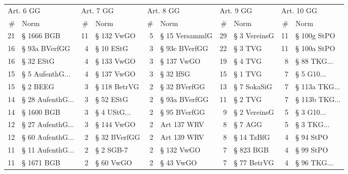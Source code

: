 \vspace{3mm}
\begin{tabular}{rlrlrlrlrl}
\toprule
\multicolumn{2}{l}{Art. 6 GG} & \multicolumn{2}{l}{Art. 7 GG} & \multicolumn{2}{l}{Art. 8 GG} & \multicolumn{2}{l}{Art. 9 GG} & \multicolumn{2}{l}{Art. 10 GG} \\
        \# &               Norm &         \# &              Norm &         \# &               Norm &         \# &         Norm &          \# &            Norm \\
\midrule
       21 &         § 1666 BGB &        11 &        § 132 VwGO &         5 &     § 15 VersammlG &        29 & § 3 VereinsG &         11 &     § 100g StPO \\
       16 &      § 93a BVerfGG &         4 &         § 10 EStG &         3 &      § 93c BVerfGG &        22 &      § 3 TVG &         11 &     § 100a StPO \\
       16 &          § 32 EStG &         4 &        § 133 VwGO &         3 &         § 137 VwGO &        19 &      § 4 TVG &          8 &   § 88 TKG... \\
       15 &  § 5 AufenthG... &         4 &        § 137 VwGO &         3 &          § 32 IfSG &        15 &      § 1 TVG &          7 &    § 5 G10... \\
       15 &           § 2 BEEG &         3 &      § 118 BetrVG &         2 &       § 32 BVerfGG &        13 &  § 7 SokaSiG &          7 & § 113a TKG... \\
       14 & § 28 AufenthG... &         3 &         § 52 EStG &         2 &      § 93a BVerfGG &        11 &      § 2 TVG &          7 & § 113b TKG... \\
       14 &         § 1600 BGB &         3 &     § 4 UStG... &         2 &       § 95 BVerfGG &         9 & § 2 VereinsG &          5 &    § 3 G10... \\
       12 & § 27 AufenthG... &         3 &        § 144 VwGO &         2 &        Art 137 WRV &         8 &      § 7 AGG &          5 &    § 3 TKG... \\
       12 & § 60 AufenthG... &         2 &      § 32 BVerfGG &         2 &        Art 139 WRV &         8 &   § 14 TzBfG &          4 &       § 94 StPO \\
       11 & § 11 AufenthG... &         2 &         § 2 SGB-7 &         2 &         § 132 VwGO &         7 &    § 823 BGB &          4 &       § 99 StPO \\
       11 &         § 1671 BGB &         2 &         § 60 VwGO &         2 &          § 43 VwGO &         7 &  § 77 BetrVG &          4 &   § 96 TKG... \\

\end{tabular}
